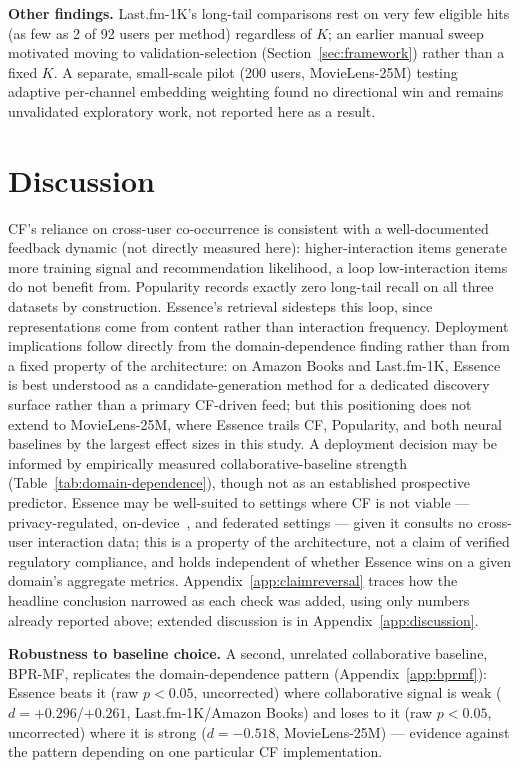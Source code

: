 \documentclass{article}
\begin{document}
\textbf{Other findings.} Last.fm-1K's long-tail comparisons rest on very few eligible hits (as few as 2 of 92 users per method) regardless of $K$; an earlier manual sweep motivated moving to validation-selection (Section~\ref{sec:framework}) rather than a fixed $K$. A separate, small-scale pilot (200 users, MovieLens-25M) testing adaptive per-channel embedding weighting found no directional win and remains unvalidated exploratory work, not reported here as a result.

\section{Discussion}
\label{sec:discussion}

CF's reliance on cross-user co-occurrence is consistent with a well-documented feedback dynamic (not directly measured here): higher-interaction items generate more training signal and recommendation likelihood, a loop low-interaction items do not benefit from. Popularity records exactly zero long-tail recall on all three datasets by construction. Essence's retrieval sidesteps this loop, since representations come from content rather than interaction frequency. Deployment implications follow directly from the domain-dependence finding rather than from a fixed property of the architecture: on Amazon Books and Last.fm-1K, Essence is best understood as a candidate-generation method for a dedicated discovery surface rather than a primary CF-driven feed; but this positioning does not extend to MovieLens-25M, where Essence trails CF, Popularity, and both neural baselines by the largest effect sizes in this study. A deployment decision may be informed by empirically measured collaborative-baseline strength (Table~\ref{tab:domain-dependence}), though not as an established prospective predictor. Essence may be well-suited to settings where CF is not viable --- privacy-regulated, on-device~\cite{yin2024}, and federated settings --- given it consults no cross-user interaction data; this is a property of the architecture, not a claim of verified regulatory compliance, and holds independent of whether Essence wins on a given domain's aggregate metrics. Appendix~\ref{app:claimreversal} traces how the headline conclusion narrowed as each check was added, using only numbers already reported above; extended discussion is in Appendix~\ref{app:discussion}.

\textbf{Robustness to baseline choice.} A second, unrelated collaborative baseline, BPR-MF, replicates the domain-dependence pattern (Appendix~\ref{app:bprmf}): Essence beats it (raw $p<0.05$, uncorrected) where collaborative signal is weak ($d=+0.296$/$+0.261$, Last.fm-1K/Amazon Books) and loses to it (raw $p<0.05$, uncorrected) where it is strong ($d=-0.518$, MovieLens-25M) --- evidence against the pattern depending on one particular CF implementation.
\end{document}
